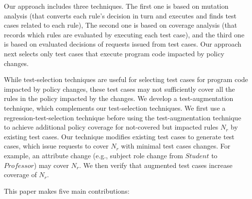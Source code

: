 
Our approach includes three techniques.
The first one is based on mutation analysis (that converts each rule's decision in turn and executes 
and finds test cases related to each rule), The second one is based on coverage analysis (that records 
which rules are evaluated by executing each test case), and the third one is based on evaluated 
decisions of requests issued from test cases. Our approach next selects only test cases that execute program code impacted by policy changes.

While test-selection techniques are useful for selecting test cases for program code impacted by policy changes, these test cases may not sufficiently cover all the rules in the policy impacted by the changes.
We develop a test-augmentation technique, which complements our test-selection techniques.
We first use a regression-test-selection technique before using the test-augmentation technique to achieve
additional policy coverage for not-covered but impacted rules $N_r$ by existing test cases.
Our technique modifies existing test cases to generate test cases, which issue requests to cover $N_r$ with minimal test cases changes. For example, an attribute change (e.g., subject role change from $Student$ to $Professor$) may cover $N_r$. We then verify that augmented test cases increase
 coverage of $N_r$.





This paper makes five main contributions:

